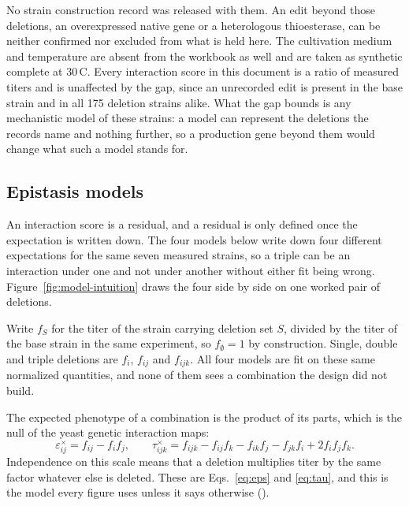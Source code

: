 No strain construction record was released with them. An edit beyond those deletions, an
overexpressed native gene or a heterologous thioesterase, can be neither confirmed nor
excluded from what is held here. The
cultivation medium and temperature are absent from the workbook as well and are taken as
synthetic complete at 30\,\textdegree C. Every interaction score in this document is a ratio
of measured titers and is unaffected by the gap, since an unrecorded edit is present in the
base strain and in all 175 deletion strains alike. What the gap bounds is any mechanistic
model of these strains: a model can represent the deletions the records name and nothing
further, so a production gene beyond them would change what such a model stands for.

\subsection*{Epistasis models}

An interaction score is a residual, and a residual is only defined once the expectation is
written down. The four models below write down four different expectations for the same
seven measured strains, so a triple can be an interaction under one and not under another
without either fit being wrong. Figure~\ref{fig:model-intuition} draws the four side by
side on one worked pair of deletions.

 Write $f_S$ for the titer of the strain carrying deletion set $S$, divided
by the titer of the base strain in the same experiment, so $f_\emptyset = 1$ by
construction. Single, double and triple deletions are $f_i$, $f_{ij}$ and $f_{ijk}$. All
four models are fit on these same normalized quantities, and none of them sees a
combination the design did not build.

 The expected phenotype of a combination is the product of its
parts, which is the null of the yeast genetic interaction maps:
%
\begin{equation}
\varepsilon^{\times}_{ij} = f_{ij} - f_i f_j ,
\qquad
\tau^{\times}_{ijk} = f_{ijk} - f_{ij} f_k - f_{ik} f_j - f_{jk} f_i + 2 f_i f_j f_k .
\label{eq:mult}
\end{equation}
%
Independence on this scale means that a deletion multiplies titer by the same factor
whatever else is deleted. These are Eqs.~\ref{eq:eps} and \ref{eq:tau}, and this is the
model every figure uses unless it says otherwise
().

